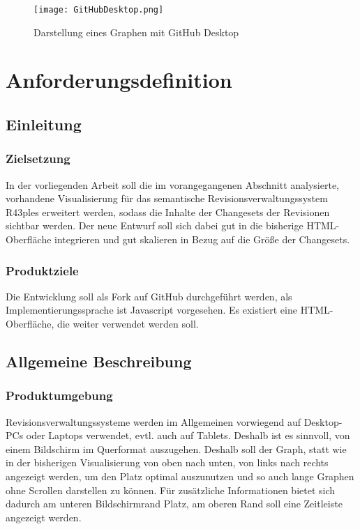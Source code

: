 \documentclass[color]{tudbook}
\begin{document}
\begin{figure}[htbp] 
  \centering
     \texttt{[image: GitHubDesktop.png]}
  \caption[Darstellung eines Graphen mit GitHub Dekstop, entnommen von \GitHubDesktop, abgerufen am 24.11.2015]{Darstellung eines Graphen mit GitHub Desktop}
  \label{fig:GitHubDesktop}
\end{figure}

\chapter{Anforderungsdefinition}
\section{Einleitung}
\subsection{Zielsetzung}
In der vorliegenden Arbeit soll die im vorangegangenen Abschnitt analysierte, vorhandene Visualisierung für das semantische Revisionsverwaltungssystem R43ples erweitert werden, sodass die Inhalte der Changesets der Revisionen sichtbar werden. Der neue Entwurf soll sich dabei gut in die bisherige HTML-Oberfläche integrieren und gut skalieren in Bezug auf die Größe der Changesets.

\subsection{Produktziele}
Die Entwicklung soll als Fork auf GitHub durchgeführt werden, als Implementierungssprache ist Javascript vorgesehen. Es existiert eine HTML-Oberfläche, die weiter verwendet werden soll.

\section{Allgemeine Beschreibung}
\subsection{Produktumgebung}
Revisionsverwaltungssysteme werden im Allgemeinen vorwiegend auf Desktop-PCs oder Laptops verwendet, evtl. auch auf Tablets. Deshalb ist es sinnvoll, von einem Bildschirm im Querformat auszugehen. Deshalb soll der Graph, statt wie in der bisherigen Visualisierung von oben nach unten, von links nach rechts angezeigt werden, um den Platz optimal auszunutzen und so auch lange Graphen ohne Scrollen darstellen zu können. Für zusätzliche Informationen bietet sich dadurch am unteren Bildschirmrand Platz, am oberen Rand soll eine Zeitleiste angezeigt werden.
\end{document}
